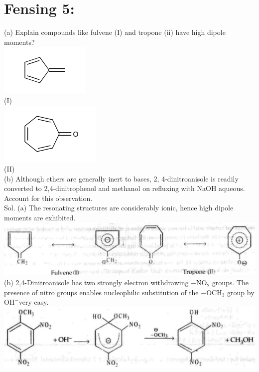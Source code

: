 \documentclass[10pt]{article}
\begin{document}
\section*{Fensing 5:}
(a) Explain compounds like fulvene (I) and tropone (ii) have high dipole moments?\\
\includegraphics{smile-05cb91a1e2f8067334e2f90efc35dad9e2b919f1}\\
(I)\\
\includegraphics{smile-31b3533f9f7e49f57bfbab697208223848406f98}\\
(II)\\
(b) Although ethers are generally inert to bases, 2, 4-dinitroanisole is readily converted to 2,4-dinitrophenol and methanol on refluxing with NaOH aqueous. Account for this observation.\\
Sol. (a) The resonating structures are considerably ionic, hence high dipole moments are exhibited.\\
\includegraphics[max width=\textwidth, center]{2025_01_28_8470952b98110cec3aabg-115}\\
(b) 2,4-Dinitroanisole has two strongly electron withdrawing $-\mathrm{NO}_{2}$ groups. The presence of nitro groups enables nucleophilic substitution of the $-\mathrm{OCH}_{3}$ group by $\mathrm{OH}^{-}$very easy.\\
\includegraphics[max width=\textwidth, center]{2025_01_28_8470952b98110cec3aabg-116}
\end{document}
